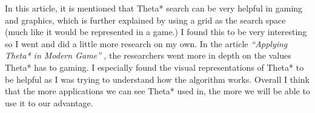 \documentclass{article}
\begin{document}
In this article, it is mentioned that Theta* search can be very helpful in gaming and graphics, which is further explained by using a grid as the search space (much like it would be represented in a game.) I found this to be very interesting so I went and did a little more research on my own. In the article {\it“Applying Theta* in Modern Game”} \citep{theta*ingaming}, the researchers went more in depth on the values Theta* has to gaming. I especially found the visual representations of Theta* to be helpful as I was trying to understand how the algorithm works. Overall I think that the more applications we can see Theta* used in, the more we will be able to use it to our advantage.



\end{document}
